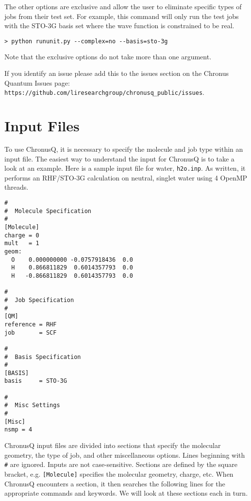 \documentclass[12pt]{article}
\begin{document}
    The other options are exclusive and allow the user to eliminate specific types of jobs from their test set. 
    For example, this command will only run the test jobs with the STO-3G basis set where the wave function 
    is constrained to be real. 
    \begin{lstlisting}
> python rununit.py --complex=no --basis=sto-3g
   \end{lstlisting}
    \noindent Note that the exclusive options do not take more than one argument. 
    
   If you identify an issue please add this to the issues section
   on the Chronus Quantum Issues page:  \newline \texttt{https://github.com/liresearchgroup/chronusq\_public/issues}. 

  \section{Input Files} \label{sec:InputFiles}
  To use ChronusQ, it is necessary to specify the molecule and job type within
  an input file. The easiest way to understand the input for ChronusQ is to take
  a look at an example. Here is a sample input file for water, \texttt{h2o.inp}.
  As written, it performs an RHF/STO-3G calculation on neutral, singlet water
  using 4 OpenMP threads.
\begin{lstlisting}
#
#  Molecule Specification
#
[Molecule]
charge = 0
mult   = 1
geom:
  O    0.000000000 -0.0757918436  0.0
  H    0.866811829  0.6014357793  0.0
  H   -0.866811829  0.6014357793  0.0

#
#  Job Specification
#
[QM]
reference = RHF
job       = SCF 

#
#  Basis Specification
#
[BASIS]
basis     = STO-3G 

#
#  Misc Settings
#
[Misc]
nsmp = 4
\end{lstlisting}
ChronusQ input files are divided into sections that specify the molecular geometry, the type of job, and other miscellaneous options. Lines beginning with \texttt{\#} are ignored. Inputs are not case-sensitive. Sections are defined by the square bracket, e.g. \texttt{[Molecule]} specifies the molecular geometry, charge, etc. When ChronusQ encounters a section, it then searches the following lines for the appropriate commands and keywords. We will look at these sections each in turn. 
   
\end{document}

